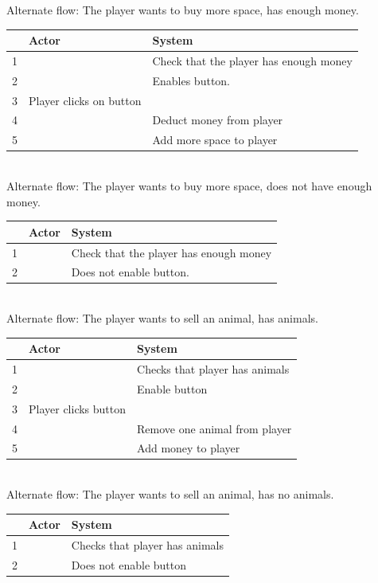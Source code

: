 \documentclass{article}
\begin{document}
Alternate flow: The player wants to buy more space, has enough money.\\
\begin{tabular}{|c|l|l|} \hline
    & Actor & System \\ \hline
    1 & & Check that the player has enough money \\ \hline
    2 & & Enables button. \\ \hline
    3 & Player clicks on button \\ \hline
    4 & & Deduct money from player \\ \hline
    5 & & Add more space to player \\ \hline
\end{tabular}\\
Alternate flow: The player wants to buy more space, does not have enough money.\\
\begin{tabular}{|c|l|l|} \hline
    & Actor & System \\ \hline
    1 & & Check that the player has enough money \\ \hline
    2 & & Does not enable button. \\ \hline
\end{tabular}\\
Alternate flow: The player wants to sell an animal, has animals.\\
\begin{tabular}{|c|l|l|} \hline
    & Actor & System \\ \hline
    1 & & Checks that player has animals \\ \hline
    2 & & Enable button \\ \hline
    3 & Player clicks button & \\ \hline
    4 & & Remove one animal from player \\ \hline
    5 & & Add money to player \\ \hline
\end{tabular}\\
Alternate flow: The player wants to sell an animal, has no animals.\\
\begin{tabular}{|c|l|l|} \hline
    & Actor & System \\ \hline
    1 & & Checks that player has animals \\ \hline
    2 & & Does not enable button \\ \hline
\end{tabular}
\end{document}

